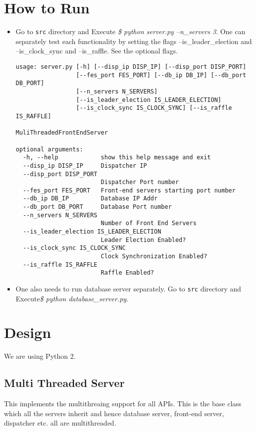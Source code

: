 \documentclass{article}
\begin{document}
\section{How to Run}
\begin{itemize}
\item Go to {\tt src} directory and Execute {\it \$ python server.py --n\_servers 3}. One can separately test each functionality by setting the flags --is\_leader\_election and --is\_clock\_sync and --is\_raffle. See the optional flags.
\begin{Verbatim}[commandchars=\\\{\}]
usage: server.py [-h] [--disp_ip DISP_IP] [--disp_port DISP_PORT]
                 [--fes_port FES_PORT] [--db_ip DB_IP] [--db_port DB_PORT]
                 [--n_servers N_SERVERS]
                 [--is_leader_election IS_LEADER_ELECTION]
                 [--is_clock_sync IS_CLOCK_SYNC] [--is_raffle IS_RAFFLE]

MuliThreadedFrontEndServer

optional arguments:
  -h, --help            show this help message and exit
  --disp_ip DISP_IP     Dispatcher IP
  --disp_port DISP_PORT
                        Dispatcher Port number
  --fes_port FES_PORT   Front-end servers starting port number
  --db_ip DB_IP         Database IP Addr
  --db_port DB_PORT     Database Port number
  --n_servers N_SERVERS
                        Number of Front End Servers
  --is_leader_election IS_LEADER_ELECTION
                        Leader Election Enabled?
  --is_clock_sync IS_CLOCK_SYNC
                        Clock Synchronization Enabled?
  --is_raffle IS_RAFFLE
                        Raffle Enabled?

\end{Verbatim} 
\item One also needs to run database server separately. Go to {\tt src} directory and Execute{\it \$ python database\_server.py}.
\end{itemize}


\section{Design}
We are using Python 2.

\subsection{Multi Threaded Server}
This implements the multithreaing support for all APIs. This is the base class which all the servers inherit and hence database server, front-end server, dispatcher etc. all are multithreaded.
\end{document}
